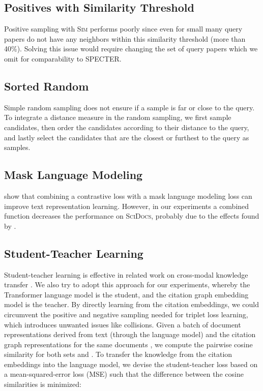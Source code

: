 \documentclass[11pt]{article}
\newcommand{\dataset}{\textsc{SciDocs}\xspace}
\newcommand{\simthreshold}{\textsc{Sim}\xspace}
\begin{document}
\subsection{Positives with Similarity Threshold}

Positive sampling with \simthreshold performs poorly since even for small  many query papers do not have any neighbors within this similarity threshold (more than 40\%). 
Solving this issue would require changing the set of query papers which we omit for comparability to SPECTER.



\subsection{Sorted Random} 
Simple random sampling does not ensure if a sample is far or close to the query.
To integrate a distance measure in the random sampling, we first sample  candidates, then order the candidates according to their distance to the query, and lastly select the  candidates that are the closest or furthest to the query as samples. 

\subsection{Mask Language Modeling}

\citet{Giorgi2021} show that combining a contrastive loss with a mask language modeling loss can improve text representation learning.
However, in our experiments a combined function decreases the performance on \dataset, probably due to the effects found by \cite{Li2020}. 

\subsection{Student-Teacher Learning}
\label{sssec:student-teacher}

Student-teacher learning is effective in related work on cross-modal knowledge transfer \citep{Kaur2021,Tian2020}. We also try to adopt this approach for our experiments, whereby the Transformer language model is the student, and the citation graph embedding model is the teacher.
By directly learning from the citation embeddings, we could circumvent the positive and negative sampling needed for triplet loss learning, which  introduces unwanted issues like collisions.
Given a batch of document representations derived from text  (through the language model) and the citation graph representations for the same documents , we compute the pairwise cosine similarity for both sets  and .
To transfer the knowledge from the citation embeddings into the language model, we devise the student-teacher loss  based on a mean-squared-error loss (MSE) such that the difference between the cosine similarities is minimized: 
\end{document}
